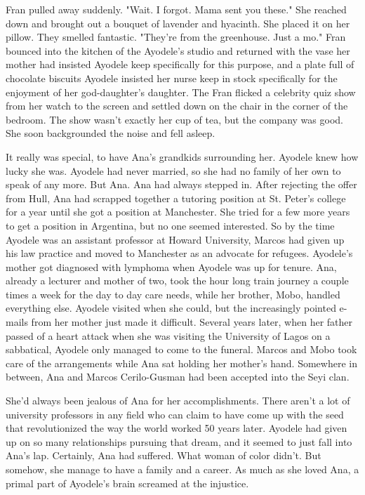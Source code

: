 \documentclass{article}
\begin{document}
Fran pulled away suddenly. "Wait. I forgot. Mama sent you these." She reached down and brought out a bouquet of lavender and hyacinth. She placed it on her pillow. They smelled fantastic. "They're from the greenhouse. Just a mo." Fran bounced into the kitchen of the Ayodele’s studio and returned with the vase her mother had insisted Ayodele keep specifically for this purpose, and a plate full of chocolate biscuits Ayodele insisted her nurse keep in stock specifically for the enjoyment of her god-daughter's daughter. The Fran flicked a celebrity quiz show from her watch to the screen and settled down on the chair in the corner of the bedroom. The show wasn't exactly her cup of tea, but the company was good. She soon backgrounded the noise and fell asleep. 

It really was special, to have Ana's grandkids surrounding her. Ayodele knew how lucky she was. Ayodele had never married, so she had no family of her own to speak of any more. But Ana. Ana had always stepped in. After rejecting the offer from Hull, Ana had scrapped together a tutoring position at St. Peter's college for a year until she got a position at Manchester. She tried for a few more years to get a position in Argentina, but no one seemed interested. So by the time Ayodele was an assistant professor at Howard University, Marcos had given up his law practice and moved to Manchester as an advocate for refugees. Ayodele's mother got diagnosed with lymphoma when Ayodele was up for tenure. Ana, already a lecturer and mother of two, took the hour long train journey a couple times a week for the day to day care needs, while her brother, Mobo, handled everything else. Ayodele visited when she could, but the increasingly pointed e-mails from her mother just made it difficult. Several years later, when her father passed of a heart attack when she was visiting the University of Lagos on a sabbatical, Ayodele only managed to come to the funeral. Marcos and Mobo took care of the arrangements while Ana sat holding her mother's hand. Somewhere in between, Ana and Marcos Cerilo-Gusman had been accepted into the Seyi clan. 

She'd always been jealous of Ana for her accomplishments. There aren't a lot of university professors in any field who can claim to have come up with the seed that revolutionized the way the world worked 50 years later. Ayodele had given up on so many relationships pursuing that dream, and it seemed to just fall into Ana's lap. Certainly, Ana had suffered. What woman of color didn't. But somehow, she manage to have a family and a career. As much as she loved Ana, a primal part of Ayodele's brain screamed at the injustice.
\end{document}
